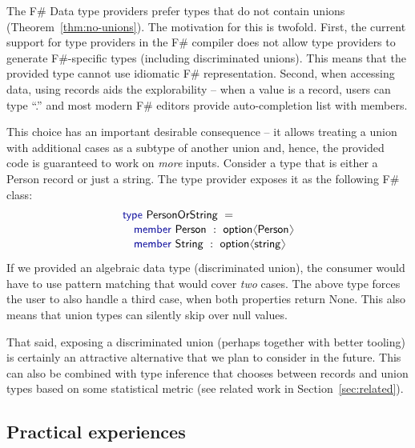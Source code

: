 \documentclass[preprint]{sigplanconf}
\newcommand{\langl}{\begin{picture}(4.5,7)
\put(1.1,2.5){\rotatebox{60}{\line(1,0){5.5}}}
\put(1.1,2.5){\rotatebox{300}{\line(1,0){5.5}}}
\end{picture}}
\newcommand{\rangl}{\begin{picture}(4.5,7)
\put(.9,2.5){\rotatebox{120}{\line(1,0){5.5}}}
\put(.9,2.5){\rotatebox{240}{\line(1,0){5.5}}}
\end{picture}}
\newcommand{\kvd}[1]{\textnormal{\textcolor{kvdclr}{\sffamily #1}}}
\newcommand{\ident}[1]{\textnormal{\sffamily #1}}
\begin{document}
The F\# Data type providers prefer types that do not contain unions (Theorem~\ref{thm:no-unions}).
The motivation for this is twofold. First, the current support for type providers in the F\# compiler
does not allow type providers to generate F\#-specific types (including discriminated unions). This
means that the provided type cannot use idiomatic F\# representation. Second, when accessing data,
using records aids the explorability -- when a value is a record, users can type ``.'' and most modern
F\# editors provide auto-completion list with members. 

This choice has an important desirable consequence -- it allows treating a union with additional 
cases as a subtype of another union and, hence, the provided code is guaranteed to work on \emph{more}
inputs. Consider a type that is either a \ident{Person} record or just a string. 
The type provider exposes it as the following F\# class:
%
\begin{equation*}
\begin{array}{l}
 \kvd{type}~\ident{PersonOrString}~=  \\[0.1em]
 \quad \kvd{member}~\ident{Person}~:~\ident{option}\langl \ident{Person}\rangl \\[0.1em]
 \quad \kvd{member}~\ident{String}~:~\ident{option}\langl \ident{string}\rangl \\[0.1em]
\end{array}
\end{equation*}
%
If we provided an algebraic data type (discriminated union), the consumer would have to use pattern
matching that would cover \emph{two} cases. The above type forces the user to also handle a third
case, when both properties return \ident{None}. This also means that union types can silently skip
over \kvd{null} values.

That said, exposing a discriminated union (perhaps together with better tooling) is certainly an
attractive alternative that we plan to consider in the future. This can also be combined with type 
inference that chooses between records and union types based on some statistical metric (see
related work in Section~\ref{sec:related}).


\subsection{Practical experiences}
\end{document}
